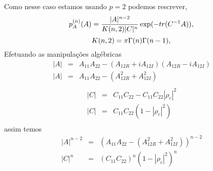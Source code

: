 Como nesse caso estamos usando $p=2$ podemos rescrever,
\begin{equation}\label{eqn34}
	p_A^{(n)}(A)=\frac{|A|^{n-2}}{K(n,2)|C|^n} \exp(-tr(C^{-1}A)), \\
\end{equation}
\begin{equation}\label{eqn35}
	K(n,2)=\pi\Gamma(n)\Gamma(n-1), \\
\end{equation}
Efetuando as manipulações algébricas
\begin{equation}\label{eqn36}
\begin{array}{ccc}
	|A|&=&A_{11}A_{22}-(A_{12R}+iA_{12I})(A_{12R}-iA_{12I})\\
	|A|&=&A_{11}A_{22}-(A_{12R}^2+A_{12I}^2)\\
\end{array}
\end{equation}
\begin{equation}\label{eqn37}
\begin{array}{ccc}
	|C|&=&C_{11}C_{22}-C_{11}C_{22}|\rho_c|^2\\
	|C|&=&C_{11}C_{22}(1-|\rho_c|^2)\\
\end{array}
\end{equation}
assim temos
\begin{equation}\label{eqn38}
\begin{array}{ccc}
	|A|^{n-2}&=&(A_{11}A_{22}-(A_{12R}^2+A_{12I}^2))^{n-2}\\
	|C|^{n}&=&(C_{11}C_{22})^{n}(1-|\rho_c|^2)^{n}\\
\end{array}
\end{equation}

